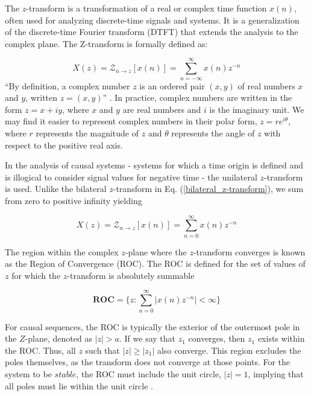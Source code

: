 \documentclass[a4paper]{report}
\begin{document}
The $z$-transform is a transformation of a real or complex time function $x(n)$, often used for analyzing discrete-time signals and systems. It is a generalization of the discrete-time Fourier transform (DTFT) that extends the analysis to the complex plane. The Z-transform is formally defined as:

\begin{equation}\label{bilateral_z-transform}
X(z) = \mathcal{Z}_{n \rightarrow z}[x(n)] = \sum^{\infty}_{n = -\infty} x(n)z^{-n}
\end{equation}
``By definition, a complex number $z$ is an ordered pair $(x, y)$ of real numbers $x$ and $y$, written $z = (x, y)$'' \citep{kreyszig2010advanced}. In practice, complex numbers are written in the form $z = x + iy$, where $x$ and $y$ are real numbers and $i$ is the imaginary unit. We may find it easier to represent complex numbers in their polar form, $z = re^{i\theta}$, where $r$ represents the magnitude of $z$ and $\theta$ represents the angle of $z$ with respect to the positive real axis.

In the analysis of causal systems - systems for which a time origin is defined and is illogical to consider signal values for negative time - the unilateral $z$-transform is used. Unlike the bilateral $z$-transform in Eq. (\ref{bilateral_z-transform}), we sum from zero to positive infinity yielding

\begin{equation}\label{unilateral_z-transform}
X(z) = \mathcal{Z}_{n \rightarrow z}[x(n)] = \sum^{\infty}_{n = 0} x(n)z^{-n}
\end{equation}

The region within the complex $z$-plane where the $z$-transform converges is known as the Region of Convergence (ROC). The ROC is defined for the set of values of $z$ for which the $z$-transform is absolutely summable

\begin{equation}\label{roc}
\textbf{ROC} = \Biggl\{ z : \sum^{\infty}_{n = 0} |x(n)z^{-n}| < \infty \Biggr\}
\end{equation}

For causal sequences, the ROC is typically the exterior of the outermost pole in the $Z$-plane, denoted as $|z| > a$. If we say that $z_1$ converges, then $z_1$ exists within the ROC. Thus, all $z$ such that $|z| \geq |z_1|$ also converge. This region excludes the poles themselves, as the transform does not converge at those points. For the system to be $stable$, the ROC must include the unit circle, $|z| = 1$, implying that all poles must lie within the unit circle \citep{loveless2021guido}.
\end{document}

